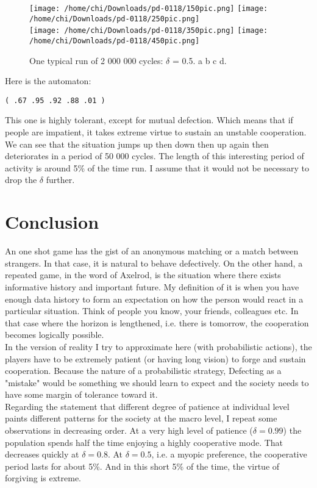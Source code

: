 \documentclass[12.5pt]{report}
\begin{document}
\begin{figure}[h!]
\center
\texttt{[image: /home/chi/Downloads/pd-0118/150pic.png]}
\texttt{[image: /home/chi/Downloads/pd-0118/250pic.png]}\\
\texttt{[image: /home/chi/Downloads/pd-0118/350pic.png]}
\texttt{[image: /home/chi/Downloads/pd-0118/450pic.png]}
\caption{One typical run of 2 000 000 cycles: $\delta$ = 0.5. a b c d.}
\end{figure}

Here is the automaton:
\begin{verbatim}
( .67 .95 .92 .88 .01 ) 
\end{verbatim}

This one is highly tolerant, except for mutual defection. Which means that if people are impatient, it takes extreme virtue to sustain an unstable cooperation. We can see that the situation jumps up then down then up again then deteriorates in a period of 50 000 cycles. The length of this interesting period of activity is around 5\% of the time run. I assume that it would not be necessary to drop the $\delta$ further.

\section{Conclusion}

An one shot game has the gist of an anonymous matching or a match between strangers. In that case, it is natural to behave defectively. On the other hand, a repeated game, in the word of Axelrod, is the situation where there exists informative history and important future. My definition of it is when you have enough data history to form an expectation on how the person would react in a particular situation. Think of people you know, your friends, colleagues etc. In that case where the horizon is lengthened, i.e. there is tomorrow, the cooperation becomes logically possible.\\

In the version of reality I try to approximate here (with probabilistic actions), the players have to be extremely patient (or having long vision) to forge and sustain cooperation. Because the nature of a probabilistic strategy, Defecting as a "mistake" would be something we should learn to expect and the society needs to have some margin of tolerance toward it.\\

Regarding the statement that different degree of patience at individual level paints different patterns for the society at the macro level, I repeat some observations in decreasing order. At a very high level of patience ($\delta = 0.99$) the population spends half the time enjoying a highly cooperative mode. That decreases quickly at $\delta = 0.8$. At $\delta = 0.5$, i.e. a myopic preference, the cooperative period lasts for about 5\%. And in this short 5\% of the time, the virtue of forgiving is extreme.
\end{document}
